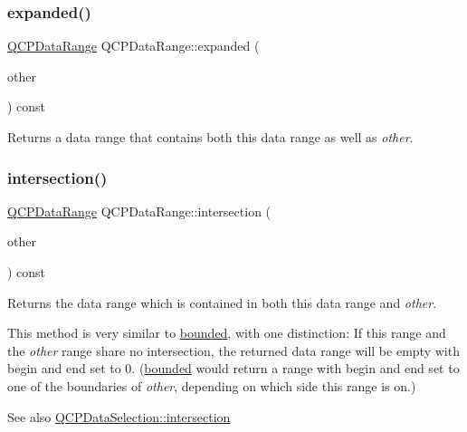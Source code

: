 \mbox{\label{class_q_c_p_data_range_a36c8ad8acf177ffeb0a72c8d73030844}} 
\subsubsection{\texorpdfstring{expanded()}{expanded()}}
{\footnotesize\ttfamily \hyperlink{class_q_c_p_data_range}{Q\+C\+P\+Data\+Range} Q\+C\+P\+Data\+Range\+::expanded (\begin{DoxyParamCaption}\item[{const \hyperlink{class_q_c_p_data_range}{Q\+C\+P\+Data\+Range} \&}]{other }\end{DoxyParamCaption}) const}

Returns a data range that contains both this data range as well as {\itshape other}. \mbox{\label{class_q_c_p_data_range_a84e1e03129dd52528efb4bac18d30183}} 
\subsubsection{\texorpdfstring{intersection()}{intersection()}}
{\footnotesize\ttfamily \hyperlink{class_q_c_p_data_range}{Q\+C\+P\+Data\+Range} Q\+C\+P\+Data\+Range\+::intersection (\begin{DoxyParamCaption}\item[{const \hyperlink{class_q_c_p_data_range}{Q\+C\+P\+Data\+Range} \&}]{other }\end{DoxyParamCaption}) const}

Returns the data range which is contained in both this data range and {\itshape other}.

This method is very similar to \hyperlink{class_q_c_p_data_range_a93529421d12fdd3a8bdb2b8061936352}{bounded}, with one distinction\+: If this range and the {\itshape other} range share no intersection, the returned data range will be empty with begin and end set to 0. (\hyperlink{class_q_c_p_data_range_a93529421d12fdd3a8bdb2b8061936352}{bounded} would return a range with begin and end set to one of the boundaries of {\itshape other}, depending on which side this range is on.)

\begin{DoxySeeAlso}{See also}
\hyperlink{class_q_c_p_data_selection_af5267ced53687561367105ee77b874ab}{Q\+C\+P\+Data\+Selection\+::intersection} 
\end{DoxySeeAlso}
\mbox{\label{class_q_c_p_data_range_a8a1c437f9beffd55621f48f961d7f679}} 
